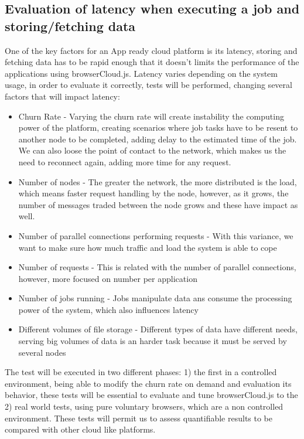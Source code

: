 \subsection{Evaluation of latency when executing a job and storing/fetching data}

One of the key factors for an App ready cloud platform is its latency, storing and fetching data has to be rapid enough that it doesn't limits the performance of the applications using browserCloud.js. Latency varies depending on the system usage, in order to evaluate it correctly, tests will be performed, changing several factors that will impact latency:

\begin{itemize}
  \item Churn Rate - Varying the churn rate will create instability the computing power of the platform, creating scenarios where job tasks have to be resent to another node to be completed, adding delay to the estimated time of the job. We can also loose the point of contact to the network, which makes us the need to reconnect again, adding more time for any request.
  \item Number of nodes - The greater the network, the more distributed is the load, which means faster request handling by the node, however, as it grows, the number of messages traded between the node grows and these have impact as well. 
  \item Number of parallel connections performing requests - With this variance, we want to make sure how much traffic and load the system is able to cope
  \item Number of requests - This is related with the number of parallel connections, however, more focused on number per application
  \item Number of jobs running - Jobs manipulate data ans consume the processing power of the system, which also influences latency
  \item Different volumes of file storage - Different types of data have different needs, serving big volumes of data is an harder task because it must be served by several nodes
\end{itemize}

The test will be executed in two different phases: 1) the first in a controlled environment, being able to modify the churn rate on demand and evaluation its behavior, these tests will be essential to evaluate and tune browserCloud.js to the 2) real world tests, using pure voluntary browsers, which are a non controlled environment. These tests will permit us to assess quantifiable results to be compared with other cloud like platforms.

